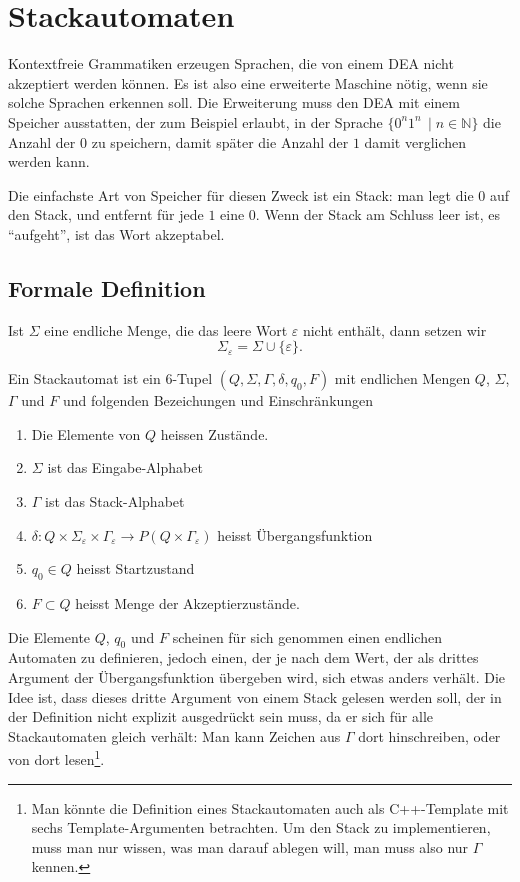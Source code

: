 \section{Stackautomaten}
%
Kontextfreie Grammatiken erzeugen Sprachen, die von einem DEA nicht
akzeptiert werden können. Es ist also eine erweiterte Maschine
nötig, wenn sie solche Sprachen erkennen soll. Die Erweiterung muss
den DEA mit einem Speicher ausstatten, der zum Beispiel erlaubt, 
in der Sprache $\{0^n1^n\,\;|\; n\in\mathbb N\}$ die Anzahl der
$0$ zu speichern, damit später die Anzahl der $1$
damit verglichen werden kann.

Die einfachste Art von Speicher für diesen Zweck ist ein Stack:
man legt die $0$ auf den Stack, und entfernt für jede $1$ eine 
$0$. Wenn der Stack am Schluss leer ist, es ``aufgeht'', ist das
Wort akzeptabel.

\subsection{Formale Definition}
\begin{definition}
Ist $\Sigma$ eine endliche Menge, die das leere Wort $\varepsilon$
nicht enthält, dann setzen wir 
\[
\Sigma_\varepsilon = \Sigma\cup \{\varepsilon\}.
\]
\end{definition}

\begin{definition}
%
%
Ein Stackautomat ist ein $6$-Tupel $(Q,\Sigma,\Gamma,\delta,q_0,F)$
mit endlichen Mengen $Q$, $\Sigma$, $\Gamma$ und $F$ und folgenden
Bezeichungen und Einschränkungen
\begin{enumerate}
%
\item Die Elemente von $Q$ heissen Zustände.
%
\item $\Sigma$ ist das Eingabe-Alphabet
%
\item $\Gamma$ ist das Stack-Alphabet
\item $\delta\colon Q\times \Sigma_\varepsilon\times\Gamma_\varepsilon
\to P(Q\times\Gamma_\varepsilon)$ heisst Übergangsfunktion
%
\item $q_0\in Q$ heisst Startzustand
%
\item $F\subset Q$ heisst Menge der Akzeptierzustände.
\end{enumerate}
\end{definition}
Die Elemente $Q$, $q_0$ und $F$ scheinen für sich genommen
einen endlichen Automaten zu definieren, jedoch einen, der je nach
dem Wert, der als drittes Argument der Übergangsfunktion
übergeben wird, sich etwas anders verhält. Die Idee ist, dass
dieses dritte Argument von einem Stack gelesen werden soll, der in
der Definition nicht explizit ausgedrückt sein muss, da er
sich für alle Stackautomaten gleich verhält: Man kann Zeichen
aus $\Gamma$ dort hinschreiben, oder von dort lesen\footnote{Man könnte
die Definition eines Stackautomaten auch als C++-Template mit
sechs Template-Argumenten betrachten. Um den Stack zu
implementieren, muss man nur wissen, was man darauf ablegen will,
man muss also nur $\Gamma$ kennen.}.


